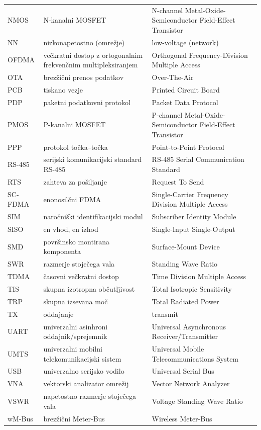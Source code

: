 \documentclass[a4paper,twoside,openright,12pt,slovene]{book}
\begin{document}
\begin{center}
\begin{longtable}{p{2.5cm}|p{5.75cm}|p{5.75cm}}
NMOS   & N-kanalni MOSFET & N-channel Metal-Oxide-Semiconductor Field-Effect Transistor \\
NN     & nizkonapetostno (omrežje) & low-voltage (network) \\
OFDMA  & večkratni dostop z ortogonalnim frekvenčnim multipleksiranjem & Orthogonal Frequency-Division Multiple Access \\
OTA    & brezžični prenos podatkov & Over-The-Air \\
PCB    & tiskano vezje & Printed Circuit Board \\
PDP    & paketni podatkovni protokol & Packet Data Protocol \\
PMOS   & P-kanalni MOSFET & P-channel Metal-Oxide-Semiconductor Field-Effect Transistor \\
PPP    & protokol točka--točka & Point-to-Point Protocol \\
RS-485 & serijski komunikacijski standard RS-485 & RS-485 Serial Communication Standard \\
RTS    & zahteva za pošiljanje & Request To Send \\
SC-FDMA & enonosilčni FDMA & Single-Carrier Frequency Division Multiple Access \\
SIM    & naročniški identifikacijski modul & Subscriber Identity Module \\
SISO   & en vhod, en izhod & Single-Input Single-Output \\
SMD    & površinsko montirana komponenta & Surface-Mount Device \\
SWR    & razmerje stoječega vala & Standing Wave Ratio \\
TDMA   & časovni večkratni dostop & Time Division Multiple Access \\
TIS    & skupna izotropna občutljivost & Total Isotropic Sensitivity \\
TRP    & skupna izsevana moč & Total Radiated Power \\
TX     & oddajanje & transmit \\
UART   & univerzalni asinhroni oddajnik/sprejemnik & Universal Asynchronous Receiver/Transmitter \\
UMTS   & univerzalni mobilni telekomunikacijski sistem & Universal Mobile Telecommunications System \\
USB    & univerzalno serijsko vodilo & Universal Serial Bus \\
VNA    & vektorski analizator omrežij & Vector Network Analyzer \\
VSWR   & napetostno razmerje stoječega vala & Voltage Standing Wave Ratio \\
wM-Bus & brezžični Meter-Bus & Wireless Meter-Bus \\

    \end{longtable}
\end{center}
\end{document}
